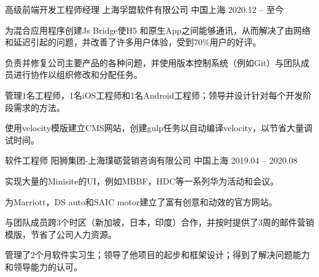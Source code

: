 
\begin{cventries}

  \cventry
    {高级前端开发工程师经理} %
    { 上海孚盟软件有限公司} %
    {中国上海} %
    {2020.12 -- 至今 } %
    {
      \begin{cvitems} %
        \item{为混合应用程序创建Js Bridge使H5 和原生App之间能够通讯，从而解决了由网络和延迟引起的问题，并改善了许多用户体验，受到70\%用户的好评。}
        \item{负责并修复公司主要产品的各种问题，并使用版本控制系统（例如Git）与团队成员进行协作以组织修改和分配任务。}
        \item{管理1名工程师，1名iOS工程师和1名Android工程师；领导并设计针对每个开发阶段需求的方法。}
        \item{使用velocity模版建立CMS网站，创建gulp任务以自动编译velocity，以节省大量调试时间。}
      \end{cvitems}
    }

  \cventry
    {软件工程师} %
    { 阳狮集团-上海璞砺营销咨询有限公司} %
    {中国上海} %
    {2019.04 -- 2020.08} %
    {
      \begin{cvitems} %
        \item{实现大量的Minisite的UI，例如MBBF，HDC等一系列华为活动和会议。}
        \item{为Marriott，DS auto和SAIC motor建立了富有创意和动效的官方网站。}
        \item{与团队成员跨3个时区（新加坡，日本，印度）合作，并按时提供了3周的邮件营销模版，节省了公司人力资源。}
        \item{管理了2个月软件实习生；领导了他项目的起步和框架设计；得到了解决问题能力和领导能力的认可。}
      \end{cvitems}
    }

\end{cventries}
